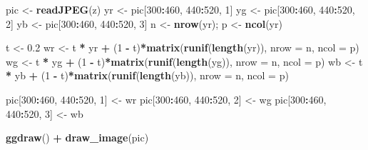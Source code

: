 \documentclass[
  11pt,
]{krantz}
\newenvironment{Shaded}{\begin{snugshade}}{\end{snugshade}}
\newcommand{\DataTypeTok}[1]{\textcolor[rgb]{0.27,0.27,0.27}{#1}}
\newcommand{\DecValTok}[1]{\textcolor[rgb]{0.06,0.06,0.06}{#1}}
\newcommand{\FloatTok}[1]{\textcolor[rgb]{0.06,0.06,0.06}{#1}}
\newcommand{\KeywordTok}[1]{\textcolor[rgb]{0.27,0.27,0.27}{\textbf{#1}}}
\newcommand{\NormalTok}[1]{#1}
\newcommand{\OperatorTok}[1]{\textcolor[rgb]{0.43,0.43,0.43}{\textbf{#1}}}
\newcommand{\StringTok}[1]{\textcolor[rgb]{0.5,0.5,0.5}{#1}}
\begin{document}
\begin{Shaded}
\begin{Highlighting}[]
\NormalTok{pic <-}\StringTok{ }\KeywordTok{readJPEG}\NormalTok{(z)}
\NormalTok{yr <-}\StringTok{ }\NormalTok{pic[}\DecValTok{300}\OperatorTok{:}\DecValTok{460}\NormalTok{, }\DecValTok{440}\OperatorTok{:}\DecValTok{520}\NormalTok{, }\DecValTok{1}\NormalTok{]}
\NormalTok{yg <-}\StringTok{ }\NormalTok{pic[}\DecValTok{300}\OperatorTok{:}\DecValTok{460}\NormalTok{, }\DecValTok{440}\OperatorTok{:}\DecValTok{520}\NormalTok{, }\DecValTok{2}\NormalTok{]}
\NormalTok{yb <-}\StringTok{ }\NormalTok{pic[}\DecValTok{300}\OperatorTok{:}\DecValTok{460}\NormalTok{, }\DecValTok{440}\OperatorTok{:}\DecValTok{520}\NormalTok{, }\DecValTok{3}\NormalTok{]}
\NormalTok{n <-}\StringTok{ }\KeywordTok{nrow}\NormalTok{(yr); p <-}\StringTok{ }\KeywordTok{ncol}\NormalTok{(yr)}

\NormalTok{t <-}\StringTok{ }\FloatTok{0.2}
\NormalTok{wr <-}\StringTok{ }\NormalTok{t }\OperatorTok{*}\StringTok{ }\NormalTok{yr }\OperatorTok{+}\StringTok{ }\NormalTok{(}\DecValTok{1} \OperatorTok{-}\StringTok{ }\NormalTok{t)}\OperatorTok{*}\KeywordTok{matrix}\NormalTok{(}\KeywordTok{runif}\NormalTok{(}\KeywordTok{length}\NormalTok{(yr)), }\DataTypeTok{nrow =}\NormalTok{ n, }\DataTypeTok{ncol =}\NormalTok{ p)}
\NormalTok{wg <-}\StringTok{ }\NormalTok{t }\OperatorTok{*}\StringTok{ }\NormalTok{yg }\OperatorTok{+}\StringTok{ }\NormalTok{(}\DecValTok{1} \OperatorTok{-}\StringTok{ }\NormalTok{t)}\OperatorTok{*}\KeywordTok{matrix}\NormalTok{(}\KeywordTok{runif}\NormalTok{(}\KeywordTok{length}\NormalTok{(yg)), }\DataTypeTok{nrow =}\NormalTok{ n, }\DataTypeTok{ncol =}\NormalTok{ p)}
\NormalTok{wb <-}\StringTok{ }\NormalTok{t }\OperatorTok{*}\StringTok{ }\NormalTok{yb }\OperatorTok{+}\StringTok{ }\NormalTok{(}\DecValTok{1} \OperatorTok{-}\StringTok{ }\NormalTok{t)}\OperatorTok{*}\KeywordTok{matrix}\NormalTok{(}\KeywordTok{runif}\NormalTok{(}\KeywordTok{length}\NormalTok{(yb)), }\DataTypeTok{nrow =}\NormalTok{ n, }\DataTypeTok{ncol =}\NormalTok{ p)}


\NormalTok{pic[}\DecValTok{300}\OperatorTok{:}\DecValTok{460}\NormalTok{, }\DecValTok{440}\OperatorTok{:}\DecValTok{520}\NormalTok{, }\DecValTok{1}\NormalTok{] <-}\StringTok{ }\NormalTok{wr}
\NormalTok{pic[}\DecValTok{300}\OperatorTok{:}\DecValTok{460}\NormalTok{, }\DecValTok{440}\OperatorTok{:}\DecValTok{520}\NormalTok{, }\DecValTok{2}\NormalTok{] <-}\StringTok{ }\NormalTok{wg}
\NormalTok{pic[}\DecValTok{300}\OperatorTok{:}\DecValTok{460}\NormalTok{, }\DecValTok{440}\OperatorTok{:}\DecValTok{520}\NormalTok{, }\DecValTok{3}\NormalTok{] <-}\StringTok{ }\NormalTok{wb}

\KeywordTok{ggdraw}\NormalTok{() }\OperatorTok{+}
\StringTok{  }\KeywordTok{draw_image}\NormalTok{(pic)}
\end{Highlighting}
\end{Shaded}
\end{document}
